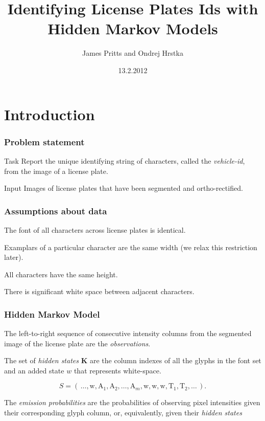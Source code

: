 \documentclass{beamer}
\title{Identifying License Plates Ids with Hidden Markov
    Models}
\author{ James Pritts and Ondrej Hrstka }
\institute[CTU FEE]{Czech Technical University in Prague - Faculty of Electrical Engineering}
\date{13.2.2012}
\begin{document}
\begin{frame}
  \titlepage
\end{frame}


\section{Introduction}

\begin{frame}
  \frametitle{Problem statement}
\item[Task] Report the unique identifying string of characters, called
  the \emph{vehicle-id}, from the image of a license plate.

\item[Input] Images of license plates that have been segmented and
  ortho-rectified.
\end{frame}

\begin{frame}
  \frametitle{Assumptions about data}
\item The font of all characters across license plates is identical.
\item Examplars of a particular character are the same width (we relax this restriction later).
\item All characters have the same height.
\item There is significant white space between adjacent characters.
\end{frame}

\begin{frame}
  \frametitle{Hidden Markov Model}

\item The left-to-right sequence of consecutive intensity columns from
  the segmented image of the license plate are the
  \emph{observations}.

\item The set of \emph{hidden states} $\mathbf{K}$ are the column
  indexes of all the glyphs in the font set and an added state $w$
  that represents white-space.

\[S =
\left(\,\dots,\text{w},\text{A}_1,\text{A}_2,\ldots,\text{A}_{m},\text{w},\text{w},\text{w},\text{T}_1,\text{T}_2,\ldots\,\right).\]


\item The \emph{emission probabilities} are the probabilities of
  observing pixel intensities given their corresponding glyph column,
  or, equivalently, given their \emph{hidden states}

\end{frame}
\end{document}
